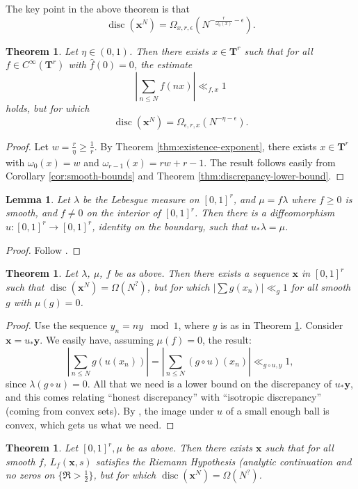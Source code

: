 \documentclass{article}
\DeclareMathOperator{\disc}{disc}
\newcommand{\bT}{\mathbf{T}}
\newcommand{\bx}{{\boldsymbol x}}
\newcommand{\by}{{\boldsymbol y}}
\newtheorem{theorem}[subsection]{Theorem}
\newtheorem{lemma}[subsection]{Lemma}
\theoremstyle{definition}
\begin{document}
The key point in the above theorem is that 
\[
	\disc(\bx^N) = \Omega_{x,r,\epsilon}\left(N^{-\frac{r}{\omega_0(x)}-\epsilon}\right) .
\]

\begin{theorem}\label{thm:fast-decay}
Let $\eta\in (0,1)$. Then there exists $x\in \bT^r$ such that for all 
$f\in C^\infty(\bT^r)$ with $\widehat f(0)=0$, the estimate 
\[
	\left| \sum_{n\leqslant N} f(n x)\right|\ll_{f,x} 1
\]
holds, but for which 
\[
	\disc(\bx^N) = \Omega_{\epsilon,r,x}\left(N^{-\eta - \epsilon}\right) .
\]
\end{theorem}
\begin{proof}
Let $w=\frac{r}{\eta} \geqslant \frac 1 r$. By 
Theorem \ref{thm:existence-exponent}, there exists $x\in \bT^r$ with 
$\omega_0(x)=w$ and $\omega_{r-1}(x)=r w+r-1$. The result follows easily 
from Corollary \ref{cor:smooth-bounds} and Theorem \ref{thm:discrepancy-lower-bound}. 
\end{proof}


\begin{lemma}
Let $\lambda$ be the Lebesgue measure on $[0,1]^r$, and $\mu=f\lambda$ 
where $f\geqslant 0$ is smooth, and $f\ne 0$ on the interior of $[0,1]^r$. Then 
there is a diffeomorphism $u\colon [0,1]^r\to [0,1]^r$, identity on the 
boundary, such that $u_\ast \lambda = \mu$. 
\end{lemma}
\begin{proof}
Follow \cite{moser-1965}. 
\end{proof}

\begin{theorem}
Let $\lambda$, $\mu$, $f$ be as above. Then there exists a sequence 
$\bx$ in $[0,1]^r$ such that $\disc(\bx^N)=\Omega(N^?)$, but for which 
$|\sum g(x_n)| \ll_g 1$ for all smooth $g$ with $\mu(g)=0$. 
\end{theorem}
\begin{proof}
Use the sequence $y_n=n y\mod 1$, where $y$ is as in Theorem \ref{thm:fast-decay}. 
Consider $\bx=u_\ast \by$. We easily have, assuming $\mu(f)=0$, the result:
\[
	\left|\sum_{n\leqslant N} g(u(x_n))\right| = \left| \sum_{n\leqslant N} (g\circ u)(x_n)\right| \ll_{g\circ u,y} 1 ,
\]
since $\lambda(g\circ u)=0$. All that we need is a lower bound on the discrepancy 
of $u_\ast \by$, and this comes relating ``honest discrepancy'' with 
``isotropic discrepancy'' (coming from convex sets). By 
\cite{polyak-2001}, the image under $u$ of a small enough ball is convex, 
which gets us what we need.
\end{proof}

\begin{theorem}
Let $[0,1]^r,\mu$ be as above. Then there exists $\bx$ such that for all smooth 
$f$, $L_f(\bx,s)$ satisfies the Riemann Hypothesis (analytic continuation and 
no zeros on $\{\Re>\frac 1 2\}$, but for which 
$\disc(\bx^N)=\Omega(N^?)$. 
\end{theorem}








\end{document}
